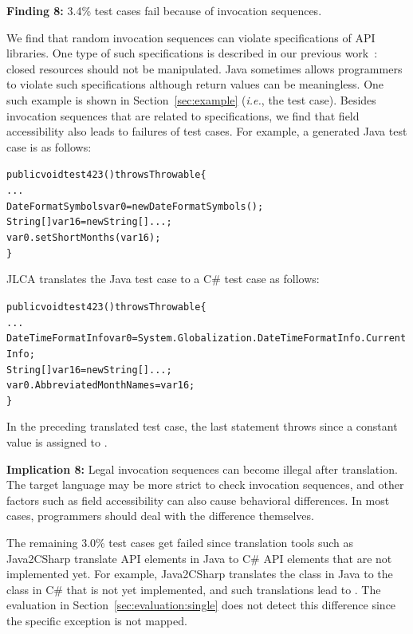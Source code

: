 \textbf{Finding 8:} 3.4\% test cases fail because of invocation sequences.

We find that random invocation sequences can violate specifications of API libraries. One type of such specifications is described in our previous work~\cite{zhong09:inferring}: closed resources should not be manipulated. Java sometimes allows programmers to violate such specifications although return values can be meaningless. One such example is shown in Section~\ref{sec:example} (\emph{i.e.}, the  test case). Besides invocation sequences that are related to specifications, we find that field accessibility also leads to failures of test cases. For example, a generated Java test case is as follows:

\begin{CodeOut}%
\begin{alltt}
public void test423() throws Throwable\{
  ...
  DateFormatSymbols var0 = new DateFormatSymbols();
  String[] var16 = new String[]{...};
  var0.setShortMonths(var16);
\}
\end{alltt}
\end{CodeOut}%

JLCA translates the Java test case to a C\# test case as follows:

\begin{CodeOut}%
\begin{alltt}
public void test423() throws Throwable\{
  ...
  DateTimeFormatInfo var0 = System.Globalization.DateTimeFormatInfo.CurrentInfo;
  String[] var16 = new String[]{...};
  var0.AbbreviatedMonthNames = var16;
\}
\end{alltt}
\end{CodeOut}%

In the preceding translated test case, the last statement throws  since a constant value is assigned to .

\textbf{Implication 8:} Legal invocation sequences can become illegal after translation. The target language may be more strict to check invocation sequences, and other factors such as field accessibility can also cause behavioral differences. In most cases, programmers should deal with the difference themselves.

The remaining 3.0\% test cases get failed since translation tools such as Java2CSharp translate API elements in Java to C\# API elements that are not implemented yet. For example, Java2CSharp translates the  class in Java to the  class in C\# that is not yet implemented, and such translations lead to . The evaluation in Section~\ref{sec:evaluation:single} does not detect this difference since the specific exception is not mapped.

